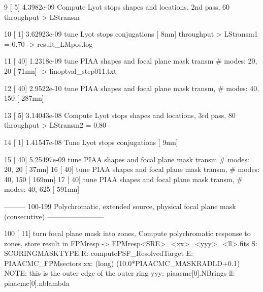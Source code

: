 \begin{DoxyVerb}
  9     [  5]   4.3982e-09      Compute Lyot stops shapes and locations, 2nd pass, 60%
        throughput > LStransm

 10     [  1]   3.62923e-09 tune Lyot stops conjugations                                        [   8mn]
        throughput > LStransm1 = 0.70
        -> result_LMpos.log

 11     [ 40]   1.2318e-09  tune PIAA shapes and focal plane mask transm # modes: 20, 20            [  71mn]
        -> linoptval_step011.txt 

 12     [ 40]   2.9522e-10  tune PIAA shapes and focal plane mask transm, # modes: 40, 150          [ 287mn]

 13     [  5]   3.14043e-08 Compute Lyot stops shapes and locations, 3rd pass, 80%
        throughput > LStransm2 = 0.80
        
 14     [  1]   1.41547e-08 Tune Lyot stops conjugations                                            [   9mn]
        
 15     [ 40]   5.25497e-09 tune PIAA shapes and focal plane mask transm # modes: 20, 20            [  37mn]
 16     [ 40]    tune PIAA shapes and focal plane mask transm, # modes: 40, 150             [ 169mn]
 17     [ 40]   tune PIAA shapes and focal plane mask transm, # modes: 40, 625              [ 591mn]




--------- 100-199  Polychromatic, extended source, physical focal plane mask (consecutive) ------------------------

100 [ 11]   turn focal plane mask into zones, Compute polychromatic response to zones, store result in FPMresp
        -> FPMresp<SRE>_<xx>_<yyy>_<ll>.fits
            S:   SCORINGMASKTYPE
            R:   computePSF_ResolvedTarget
            E:   PIAACMC_FPMsectors
            xx: (long) (10.0*PIAACMC_MASKRADLD+0.1)  NOTE: this is the outer edge of the outer ring
            yyy: piaacmc[0].NBrings
            ll:  piaacmc[0].nblambda


\end{DoxyVerb}
